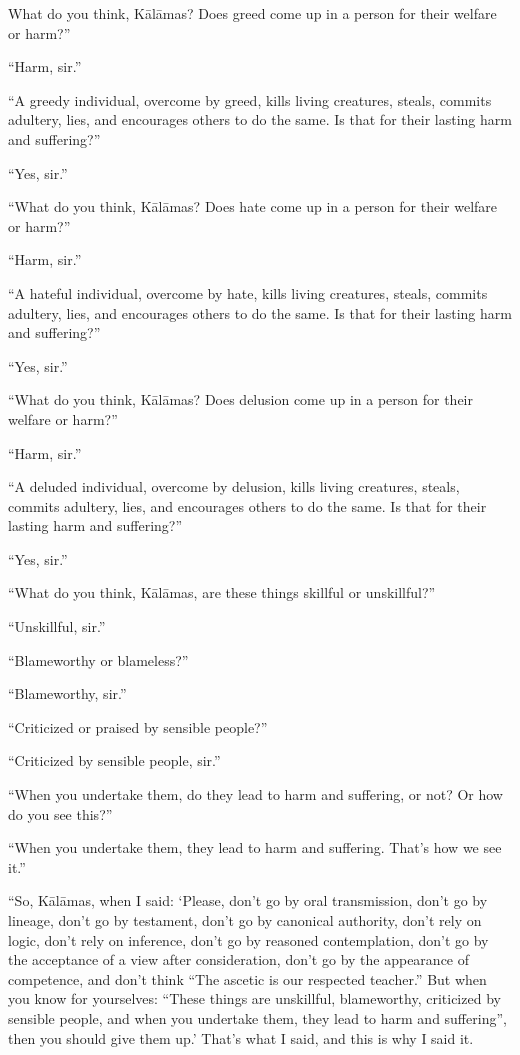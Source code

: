 \documentclass[12pt,openany]{book}%
\begin{document}
What do you think, \textsanskrit{Kālāmas}? Does greed come up in a person for their welfare or harm?” 

“Harm, sir.” 

“A greedy individual, overcome by greed, kills living creatures, steals, commits adultery, lies, and encourages others to do the same. Is that for their lasting harm and suffering?” 

“Yes, sir.” 

“What do you think, \textsanskrit{Kālāmas}? Does hate come up in a person for their welfare or harm?” 

“Harm, sir.” 

“A hateful individual, overcome by hate, kills living creatures, steals, commits adultery, lies, and encourages others to do the same. Is that for their lasting harm and suffering?” 

“Yes, sir.” 

“What do you think, \textsanskrit{Kālāmas}? Does delusion come up in a person for their welfare or harm?” 

“Harm, sir.” 

“A deluded individual, overcome by delusion, kills living creatures, steals, commits adultery, lies, and encourages others to do the same. Is that for their lasting harm and suffering?” 

“Yes, sir.” 

“What do you think, \textsanskrit{Kālāmas}, are these things skillful or unskillful?” 

“Unskillful, sir.” 

“Blameworthy or blameless?” 

“Blameworthy, sir.” 

“Criticized or praised by sensible people?” 

“Criticized by sensible people, sir.” 

“When you undertake them, do they lead to harm and suffering, or not? Or how do you see this?” 

“When you undertake them, they lead to harm and suffering. That’s how we see it.” 

“So, \textsanskrit{Kālāmas}, when I said: ‘Please, don’t go by oral transmission, don’t go by lineage, don’t go by testament, don’t go by canonical authority, don’t rely on logic, don’t rely on inference, don’t go by reasoned contemplation, don’t go by the acceptance of a view after consideration, don’t go by the appearance of competence, and don’t think “The ascetic is our respected teacher.” But when you know for yourselves: “These things are unskillful, blameworthy, criticized by sensible people, and when you undertake them, they lead to harm and suffering”, then you should give them up.’ That’s what I said, and this is why I said it. 
\end{document}
